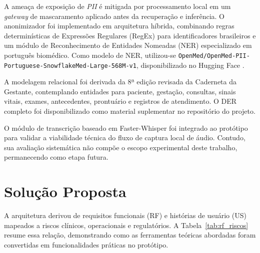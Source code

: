 \documentclass[12pt]{article}
\begin{document}
A ameaça de exposição de \textit{PII} é mitigada por processamento local em um \textit{gateway} de mascaramento aplicado antes da recuperação e inferência.
O anonimizador foi implementado em arquitetura híbrida, combinando regras determinísticas de Expressões Regulares (RegEx) para identificadores brasileiros e um módulo de Reconhecimento de Entidades Nomeadas (NER) especializado em português biomédico.
Como modelo de NER, utilizou-se \texttt{OpenMed/OpenMed-PII-Portuguese-SnowflakeMed-Large-568M-v1}, disponibilizado no Hugging Face \cite{openmed-pii-2026}.

A modelagem relacional foi derivada da 8ª edição revisada da Caderneta da Gestante, contemplando entidades para paciente, gestação, consultas, sinais vitais, exames, antecedentes, prontuário e registros de atendimento.
O DER completo foi disponibilizado como material suplementar no repositório do projeto.

O módulo de transcrição baseado em Faster-Whisper foi integrado ao protótipo para validar a viabilidade técnica do fluxo de captura local de áudio. Contudo, sua avaliação sistemática não compõe o escopo experimental deste trabalho, permanecendo como etapa futura.



\section{Solução Proposta}

A arquitetura derivou de requisitos funcionais (RF) e histórias de usuário (US) mapeados a riscos clínicos, operacionais e regulatórios.
A Tabela~\ref{tab:rf_riscos} resume essa relação, demonstrando como as ferramentas teóricas abordadas foram convertidas em funcionalidades práticas no protótipo.
\end{document}

